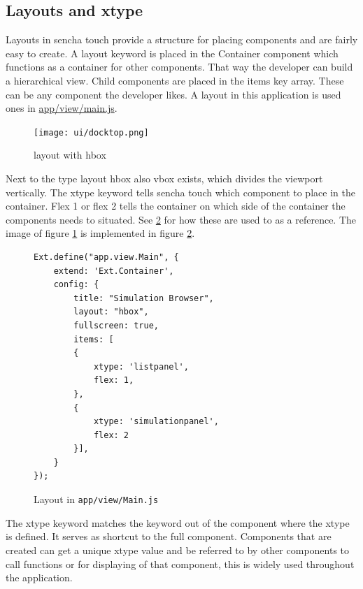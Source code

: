 \subsection{Layouts and xtype}
Layouts in sencha touch provide a structure for placing components and are fairly easy to create. A layout keyword is placed in the Container component which functions as a container for other components. That way the developer can build a hierarchical view. Child components are placed in the items key array. These can be any component the developer likes. A layout in this application is used ones in \url{app/view/main.js}. 

\begin{figure}[H]
\center
\texttt{[image: ui/docktop.png]}
\caption{layout with hbox}
\label{fig:layout}
\end{figure}

Next to the type layout hbox also vbox exists, which divides the viewport vertically.  The xtype keyword tells sencha touch which component to place in the container. Flex 1 or flex 2 tells the container on which side of the container the components needs to situated. See \ref{fig:layout_impl} for how these are used to as a reference. The image of figure \ref{fig:layout} is implemented in figure \ref{fig:layout_impl}.

\begin{figure}[H]
\begin{lstlisting}
Ext.define("app.view.Main", {
    extend: 'Ext.Container',
    config: {
        title: "Simulation Browser",
        layout: "hbox",
        fullscreen: true,
        items: [
        {
            xtype: 'listpanel',
            flex: 1,
        },
        {    
            xtype: 'simulationpanel',
            flex: 2
        }],
    }
});
\end{lstlisting}
\caption{Layout in \texttt{app/view/Main.js}}
\label{fig:layout_impl}
\end{figure}
The xtype keyword matches the keyword out of the component where the xtype is defined. It serves as shortcut to the full component. Components that are created can get a unique xtype value and be referred to by other components to call functions or for displaying  of that component, this is widely used throughout the application.

